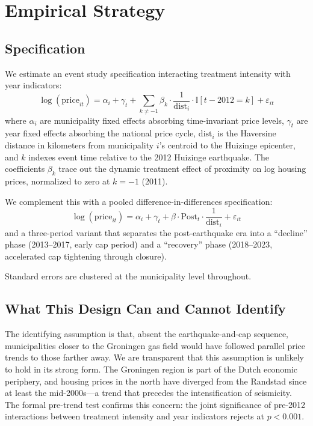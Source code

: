 \documentclass[12pt]{article}
\newcommand{\ind}{\mathbb{I}}
\begin{document}


\section{Empirical Strategy}\label{sec:strategy}

\subsection{Specification}

We estimate an event study specification interacting treatment intensity with year indicators:
\begin{equation}\label{eq:eventstudy}
\log(\text{price}_{it}) = \alpha_i + \gamma_t + \sum_{k \neq -1} \beta_k \cdot \frac{1}{\text{dist}_i} \cdot \ind[t - 2012 = k] + \varepsilon_{it}
\end{equation}
where $\alpha_i$ are municipality fixed effects absorbing time-invariant price levels, $\gamma_t$ are year fixed effects absorbing the national price cycle, $\text{dist}_i$ is the Haversine distance in kilometers from municipality $i$'s centroid to the Huizinge epicenter, and $k$ indexes event time relative to the 2012 Huizinge earthquake. The coefficients $\beta_k$ trace out the dynamic treatment effect of proximity on log housing prices, normalized to zero at $k = -1$ (2011).

We complement this with a pooled difference-in-differences specification:
\begin{equation}\label{eq:did}
\log(\text{price}_{it}) = \alpha_i + \gamma_t + \beta \cdot \text{Post}_t \cdot \frac{1}{\text{dist}_i} + \varepsilon_{it}
\end{equation}
and a three-period variant that separates the post-earthquake era into a ``decline'' phase (2013--2017, early cap period) and a ``recovery'' phase (2018--2023, accelerated cap tightening through closure).

Standard errors are clustered at the municipality level throughout.

\subsection{What This Design Can and Cannot Identify}

The identifying assumption is that, absent the earthquake-and-cap sequence, municipalities closer to the Groningen gas field would have followed parallel price trends to those farther away. We are transparent that this assumption is unlikely to hold in its strong form. The Groningen region is part of the Dutch economic periphery, and housing prices in the north have diverged from the Randstad since at least the mid-2000s---a trend that precedes the intensification of seismicity. The formal pre-trend test confirms this concern: the joint significance of pre-2012 interactions between treatment intensity and year indicators rejects at $p < 0.001$.
\end{document}

